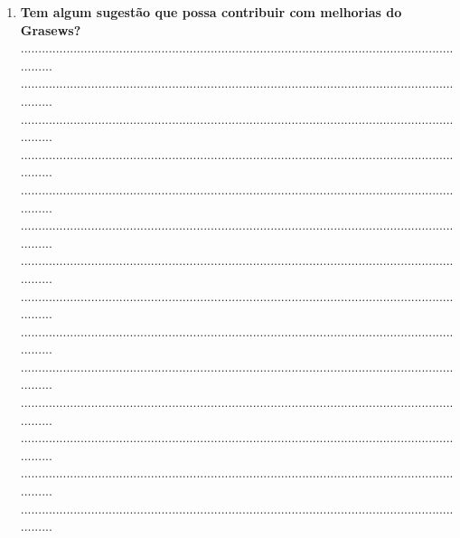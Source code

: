 \begin{enumerate}[label=Q\arabic*]
    \item
    \textbf{Tem algum sugestão que possa contribuir com melhorias do Grasews?}
    \\
    ....................................................................................................................................
    \\
    ....................................................................................................................................
    \\
    ....................................................................................................................................
    \\
    ....................................................................................................................................
    \\
    ....................................................................................................................................
    \\
    ....................................................................................................................................
    \\
    ....................................................................................................................................
    \\
    ....................................................................................................................................
    \\
    ....................................................................................................................................
    \\
    ....................................................................................................................................
    \\
    ....................................................................................................................................
    \\
    ....................................................................................................................................
    \\
    ....................................................................................................................................
    \\
    ....................................................................................................................................

\end{enumerate}
